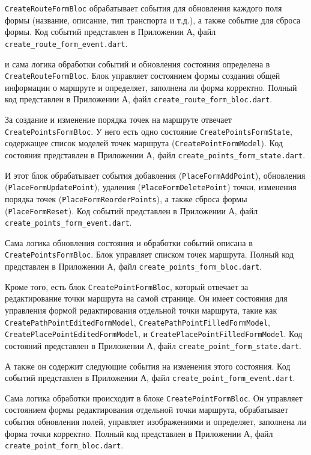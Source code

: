 \texttt{CreateRouteFormBloc} обрабатывает события для обновления каждого поля формы (название, описание, тип транспорта и т.д.), а также событие для сброса формы. Код событий представлен в Приложении А, файл \texttt{create\_route\_form\_event.dart}.

и сама логика обработки событий и обновления состояния определена в \texttt{CreateRouteFormBloc}. Блок управляет состоянием формы создания общей информации о маршруте и определяет, заполнена ли форма корректно. Полный код представлен в Приложении А, файл \texttt{create\_route\_form\_bloc.dart}.

За создание и изменение порядка точек на маршруте отвечает \texttt{CreatePointsFormBloc}. У него есть одно состояние \texttt{CreatePointsFormState}, содержащее список моделей точек маршрута (\texttt{CreatePointFormModel}). Код состояния представлен в Приложении А, файл \texttt{create\_points\_form\_state.dart}.

И этот блок обрабатывает события добавления (\texttt{PlaceFormAddPoint}), обновления (\texttt{PlaceFormUpdatePoint}), удаления (\texttt{PlaceFormDeletePoint}) точки, изменения порядка точек (\texttt{PlaceFormReorderPoints}), а также сброса формы (\texttt{PlaceFormReset}). Код событий представлен в Приложении А, файл \texttt{create\_points\_form\_event.dart}.

Сама логика обновления состояния и обработки событий описана в \texttt{CreatePointsFormBloc}. Блок управляет списком точек маршрута. Полный код представлен в Приложении А, файл \texttt{create\_points\_form\_bloc.dart}.

Кроме того, есть блок \texttt{CreatePointFormBloc}, который отвечает за редактирование точки маршрута на самой странице. Он имеет состояния для управления формой редактирования отдельной точки маршрута, такие как \texttt{CreatePathPointEditedFormModel}, \texttt{CreatePathPointFilledFormModel}, \texttt{CreatePlacePointEditedFormModel}, и \texttt{CreatePlacePointFilledFormModel}. Код состояний представлен в Приложении А, файл \texttt{create\_point\_form\_state.dart}.

А также он содержит следующие события на изменения этого состояния. Код событий представлен в Приложении А, файл \texttt{create\_point\_form\_event.dart}.

Сама логика обработки происходит в блоке \texttt{CreatePointFormBloc}. Он управляет состоянием формы редактирования отдельной точки маршрута, обрабатывает события обновления полей, управляет изображениями и определяет, заполнена ли форма точки корректно. Полный код представлен в Приложении А, файл \texttt{create\_point\_form\_bloc.dart}.

